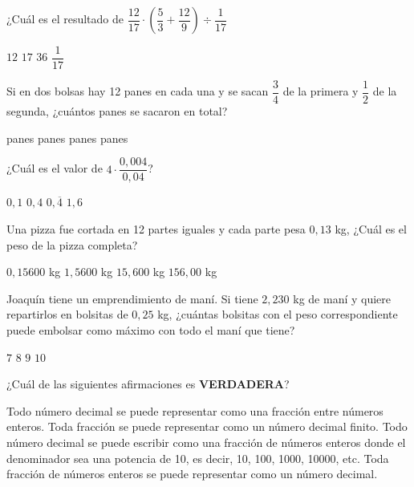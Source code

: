 \documentclass[spanish,letterpaper, 12pt, addpoints, answers]{exam}
\begin{document}
\begin{questions}
\newpage
    \question[1] ¿Cuál es el resultado de $\dfrac{12}{17}\cdot \left(\dfrac{5}{3}+\dfrac{12}{9}\right)\div \dfrac{1}{17}$
    \begin{choices}
        \choice $12$
        \choice $17$
        \CorrectChoice $36$
        \choice $\dfrac{1}{17}$
    \end{choices}
    \vspace{0.15in}

    \question[1] Si en dos bolsas hay 12 panes en cada una y se sacan $\dfrac{3}{4}$ de la primera y $\dfrac{1}{2}$ de la segunda, ¿cuántos panes se sacaron en total?
    \begin{choices}
         panes
         panes
         panes
         panes
    \end{choices}
    \vspace{0.15in}

    \question[1] ¿Cuál es el valor de $4\cdot \dfrac{0,004}{0,04}$?
    \begin{choices}
        \choice $0,1$
        \CorrectChoice $0,4$
        \choice $0,\overline{4}$
        \choice $1,6$
    \end{choices}
    \vspace{0.15in}

    \question[1] Una pizza fue cortada en 12 partes iguales y cada parte pesa $0,13$ kg, ¿Cuál es el peso de la pizza completa?
    \begin{choices}
        \choice $0,15600$ kg
        \CorrectChoice $1,5600$ kg
        \choice $15,600$ kg
        \choice $156,00$ kg
    \end{choices}
    \vspace{0.15in}

    \question[1] Joaquín tiene un emprendimiento de maní. Si tiene $2,230$ kg de maní y quiere repartirlos en bolsitas de $0,25$ kg, ¿cuántas bolsitas con el peso correspondiente puede embolsar como máximo con todo el maní que tiene?
    \begin{choices}
        \choice $7$
        \CorrectChoice $8$
        \choice $9$
        \choice $10$
    \end{choices}
    \vspace{0.15in}

    \question[1] ¿Cuál de las siguientes afirmaciones es \textbf{VERDADERA}?

    \begin{choices}
        \choice Todo número decimal se puede representar como una fracción entre números enteros.
        \choice Toda fracción se puede representar como un número decimal finito.
        \choice Todo número decimal se puede escribir como una fracción de números enteros donde el denominador sea una potencia de 10, es decir, 10, 100, 1000, 10000, etc.
        \CorrectChoice Toda fracción de números enteros se puede representar como un número decimal.
    \end{choices}
    \vspace{0.15in}


\end{questions}
\end{document}

